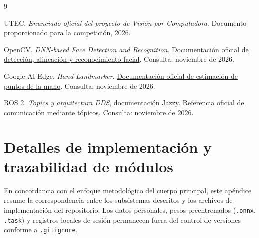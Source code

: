 \documentclass[11pt,a4paper]{article}
\begin{document}
\clearpage
{}
{}
\begin{thebibliography}{9}

UTEC.
\emph{Enunciado oficial del proyecto de Visión por Computadora}.
Documento proporcionado para la competición, 2026.

OpenCV.
\emph{DNN-based Face Detection and Recognition}.
\href{https://docs.opencv.org/4.x/d0/dd4/tutorial_dnn_face.html}
{Documentación oficial de detección, alineación y reconocimiento facial}.
Consulta: noviembre de 2026.

Google AI Edge.
\emph{Hand Landmarker}.
\href{https://developers.google.com/edge/mediapipe/solutions/vision/hand_landmarker}
{Documentación oficial de estimación de puntos de la mano}.
Consulta: noviembre de 2026.

ROS 2.
\emph{Topics y arquitectura DDS}, documentación Jazzy.
\href{https://github.com/ros2/ros2_documentation/blob/jazzy/source/Concepts/Basic/About-Topics.rst}
{Referencia oficial de comunicación mediante tópicos}.
Consulta: noviembre de 2026.

\end{thebibliography}

\clearpage
\appendix
\section{Detalles de implementación y trazabilidad de módulos}

En concordancia con el enfoque metodológico del cuerpo principal, este apéndice
resume la correspondencia entre los subsistemas descritos y los archivos de
implementación del repositorio. Los datos personales, pesos preentrenados
(\texttt{.onnx}, \texttt{.task}) y registros locales de sesión permanecen fuera
del control de versiones conforme a \texttt{.gitignore}.
\end{document}
